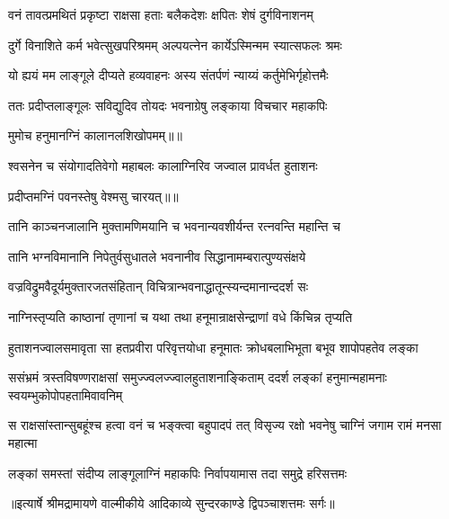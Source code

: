 \twolineshloka
{वनं तावत्प्रमथितं प्रकृष्टा राक्षसा हताः}
{बलैकदेशः क्षपितः शेषं दुर्गविनाशनम्} %

\twolineshloka
{दुर्गे विनाशिते कर्म भवेत्सुखपरिश्रमम्}
{अल्पयत्नेन कार्येऽस्मिन्मम स्यात्सफलः श्रमः} %

\twolineshloka
{यो ह्ययं मम लाङ्गूले दीप्यते हव्यवाहनः}
{अस्य संतर्पणं न्याय्यं कर्तुमेभिर्गृहोत्तमैः} %

\twolineshloka
{ततः प्रदीप्तलाङ्गूलः सविद्युदिव तोयदः}
{भवनाग्रेषु लङ्काया विचचार महाकपिः} %

{मुमोच हनुमानग्निं कालानलशिखोपमम्॥॥} %

\addtocounter{shlokacount}{1}

\twolineshloka
{श्वसनेन च संयोगादतिवेगो महाबलः}
{कालाग्निरिव जज्वाल प्रावर्धत हुताशनः} %

{प्रदीप्तमग्निं पवनस्तेषु वेश्मसु चारयत्॥॥} %

\addtocounter{shlokacount}{1}

\twolineshloka
{तानि काञ्चनजालानि मुक्तामणिमयानि च}
{भवनान्यवशीर्यन्त रत्नवन्ति महान्ति च} %

\twolineshloka
{तानि भग्नविमानानि निपेतुर्वसुधातले}
{भवनानीव सिद्धानामम्बरात्पुण्यसंक्षये} %

\twolineshloka
{वज्रविद्रुमवैदूर्यमुक्तारजतसंहितान्}
{विचित्रान्भवनाद्धातून्स्यन्दमानान्ददर्श सः} %

\twolineshloka
{नाग्निस्तृप्यति काष्ठानां तृणानां च यथा तथा}
{हनूमान्राक्षसेन्द्राणां वधे किंचिन्न तृप्यति} %

\fourlineindentedshloka
{हुताशनज्वालसमावृता सा}
{ हतप्रवीरा परिवृत्तयोधा}
{हनूमातः क्रोधबलाभिभूता}
{ बभूव शापोपहतेव लङ्का} %

\fourlineindentedshloka
{ससंभ्रमं त्रस्तविषण्णराक्षसां}
{ समुज्ज्वलज्ज्वालहुताशनाङ्किताम्}
{ददर्श लङ्कां हनुमान्महामनाः}
{ स्वयम्भुकोपोपहतामिवावनिम्} %

\fourlineindentedshloka
{स राक्षसांस्तान्सुबहूंश्च हत्वा}
{ वनं च भङ्क्त्वा बहुपादपं तत्}
{विसृज्य रक्षो भवनेषु चाग्निं}
{ जगाम रामं मनसा महात्मा} %

\twolineshloka
{लङ्कां समस्तां संदीप्य लाङ्गूलाग्निं महाकपिः}
{निर्वापयामास तदा समुद्रे हरिसत्तमः} %


{॥इत्यार्षे श्रीमद्रामायणे वाल्मीकीये आदिकाव्ये सुन्दरकाण्डे द्विपञ्चाशत्तमः सर्गः॥}


